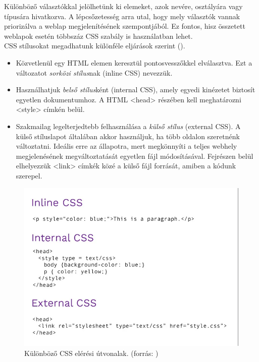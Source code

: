 	Különböző választókkal jelölhetünk ki elemeket, azok nevére, osztályára vagy típusára hivatkozva. A lépcsőzetesség arra utal, hogy mely választók vannak priorizálva a weblap megjelenítésének szempontjából. Ez fontos, hisz összetett weblapok esetén többszáz CSS szabály is használatban lehet. \\

\pagebreak
	CSS stílusokat megadhatunk különféle eljárások szerint (). \\
\begin{itemize}
\item Közvetlenül egy HTML elemen keresztül pontosvesszőkkel elválasztva. Ezt a változatot \emph{sorközi stílus}nak (inline CSS) nevezzük.
\item Használhatjuk \emph{belső stílus}ként (internal CSS), amely egyedi kinézetet biztosít 
egyetlen dokumentumhoz. A HTML <head> részében kell meghatározni \\
<style> címkén belül.
\item Szakmailag legelterjedtebb felhasználása a \emph{külső stílus} (external CSS). A külső stíluslapot általában akkor használjuk, ha több oldalon szeretnénk változtatni. Ideális erre az állapotra, mert megkönnyíti a teljes webhely megjelenésének megváltoztatását egyetlen fájl módosításával. Fejrészen belül elhelyezzük <link> címkék közé a külső fájl forrását, amiben a kódunk szerepel.
\end{itemize}

\begin{figure}[h]
\centering
\includegraphics[scale=0.5]{images/cssTypes.png}
\caption{Különböző CSS elérési útvonalak. (forrás: \cite{cssTypes})}
\label{fig:css}
\end{figure}

